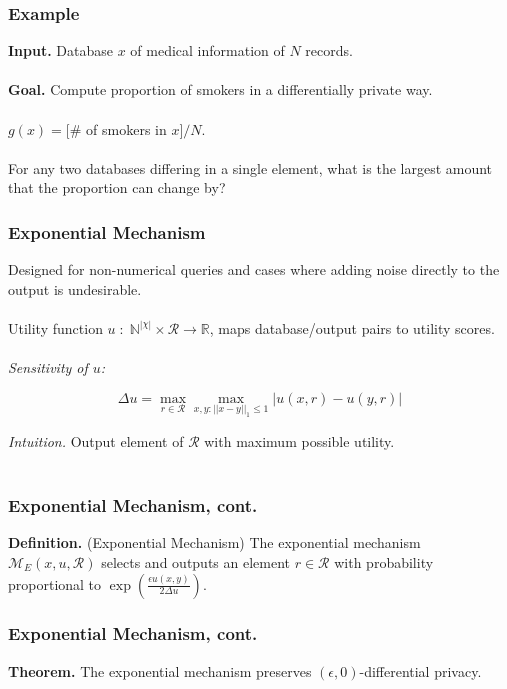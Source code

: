 \documentclass[aspectratio=169]{beamer}
\newcommand{\emm}{\mathcal{M}}
\newcommand{\dbd}{\mathbb{N}^{|\chi|}}
\begin{document}
\begin{frame}
\frametitle{Example}

\textbf{Input.} Database $x$ of medical information of $N$ records.\\~\\

\textbf{Goal.} Compute proportion of smokers in a differentially private way.\\~\\

$g(x) = [\#$ of smokers in $x]/N$.\\~\\

For any two databases differing in a single element, what is the largest amount that the proportion can change by?
\end{frame}

\begin{frame}
\frametitle{Exponential Mechanism}

Designed for non-numerical queries and cases where adding noise directly to the output is undesirable.\\~\\

Utility function $u\;:\; \dbd \times \mathcal{R} \rightarrow \mathbb{R}$, maps database/output pairs to utility scores.\\~\\

\emph{Sensitivity of $u$:}

$$\Delta u = \max_{r \in \mathcal{R}} \max_{x,y:||x-y||_1 \leq 1} |u(x,r) - u(y,r)|$$

\emph{Intuition.} Output element of $\mathcal{R}$ with maximum possible utility.\\~\\
\end{frame}

\begin{frame}
\frametitle{Exponential Mechanism, cont.}

\textbf{Definition.} (Exponential Mechanism) The exponential mechanism $\emm_E(x, u, \mathcal{R})$ selects and outputs an element $r \in \mathcal{R}$ with probability proportional to $\exp(\frac{\epsilon u(x,y)}{2\Delta u})$.
\end{frame}

\begin{frame}
\frametitle{Exponential Mechanism, cont.}

\textbf{Theorem.} The exponential mechanism preserves $(\epsilon, 0)$-differential privacy.
\end{frame}
\end{document}
